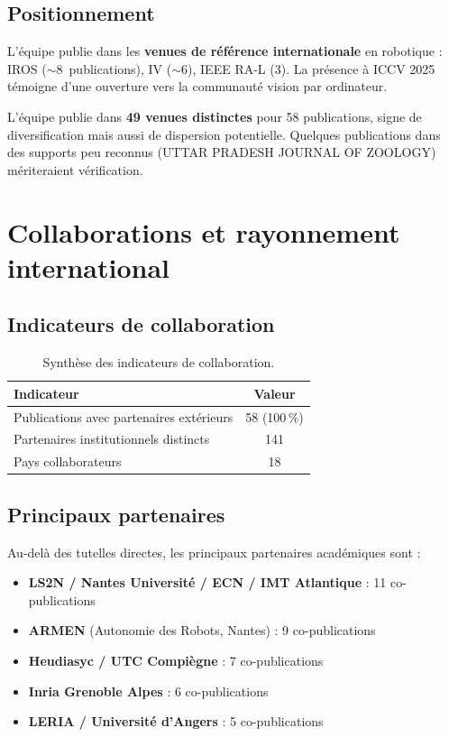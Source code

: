 \documentclass[a4paper,11pt]{article}
\begin{document}
\subsection{Positionnement}

L'équipe publie dans les \textbf{venues de référence internationale} en robotique : IROS ($\sim$8~publications), IV ($\sim$6), IEEE RA-L (3). La présence à ICCV 2025 témoigne d'une ouverture vers la communauté vision par ordinateur.

L'équipe publie dans \textbf{49 venues distinctes} pour 58 publications, signe de diversification mais aussi de dispersion potentielle. Quelques publications dans des supports peu reconnus (UTTAR PRADESH JOURNAL OF ZOOLOGY) mériteraient vérification.

\section{Collaborations et rayonnement international}

\subsection{Indicateurs de collaboration}

\begin{table}[h!]
\centering
\begin{tabular}{lc}
\toprule
\textbf{Indicateur} & \textbf{Valeur} \\
\midrule
Publications avec partenaires extérieurs & 58 (100\,\%) \\
Partenaires institutionnels distincts & 141 \\
Pays collaborateurs & 18 \\
\bottomrule
\end{tabular}
\caption{Synthèse des indicateurs de collaboration.}
\end{table}

\subsection{Principaux partenaires}

Au-delà des tutelles directes, les principaux partenaires académiques sont :

\begin{itemize}[nosep]
  \item \textbf{LS2N / Nantes Université / ECN / IMT Atlantique} : 11 co-publications
  \item \textbf{ARMEN} (Autonomie des Robots, Nantes) : 9 co-publications
  \item \textbf{Heudiasyc / UTC Compiègne} : 7 co-publications
  \item \textbf{Inria Grenoble Alpes} : 6 co-publications
  \item \textbf{LERIA / Université d'Angers} : 5 co-publications
\end{itemize}
\end{document}

